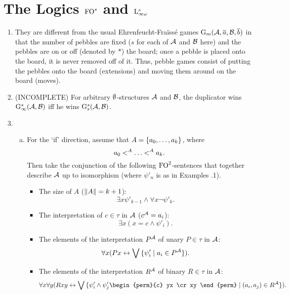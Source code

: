 \section{The Logics $\folog[s]$ and $\inflog[s]{\infty}$}
\begin{enumerate}[1.]
%
\item {} They are different from the usual Ehrenfeucht-Fra\"iss\'e games $\game{m}(\strct{A}, \vect{a}, \strct{B}, \vect{b})$ in that the number of pebbles are fixed ($s$ for each of $\mathcal{A}$ and $\mathcal{B}$ here) and the pebbles are on or off (denoted by $\ast$) the board; once a pebble is placed onto the board, it is never removed off of it. Thus, pebble games consist of putting the pebbles onto the board (extensions) and moving them around on the board (moves).
%
\item {} (INCOMPLETE) For arbitrary $\emptyset$-structures $\mathcal{A}$ and $\mathcal{B}$, the duplicator wins $\game[s]{\infty}(\strct{A}, \strct{B})$ iff he wins $\game[s]{s}(\strct{A}, \strct{B})$.
%
\item {}
\begin{enumerate}[(a)]
\item For the `if' direction, assume that $A = {\{a_0, \ldots, a_k\}}$, where
\[
a_0 \mathrel{<^{A}} \ldots \mathrel{<^{A}} a_k.
\]
Then take the conjunction of the following $\folog[2]$-sentences that together describe $\mathcal{A}$ up to isomorphism (where $\psi'_n$ is as in Examples \thesection.1).
\begin{itemize}
\item The size of $A$ ($\|A\| = k + 1$):
\[
\exists x \psi'_{k - 1} \land \forall x \neg\psi'_k.
\]
\item The interpretation of $c \in \tau$ in $\mathcal{A}$ ($c^{\mathcal{A}} = a_i$):
\[
\exists x (x = c \land \psi'_i).
\]
\item The elements of the interpretation $P^{\mathcal{A}}$ of unary $P \in \tau$ in $\mathcal{A}$:
\[
\forall x (Px \leftrightarrow \bigvee {\{\psi'_i \mid a_i \in P^{\mathcal{A}}\}}).
\]
\item The elements of the interpretation $R^{\mathcal{A}}$ of binary $R \in \tau$ in $\mathcal{A}$:
\[
\forall x \forall y (Rxy \liff \blor \setm{\psi'_i \land \psi'_j\begin{perm}{c} yx \cr xy \end{perm}}{(a_i, a_j) \in \intpr{R}{\strct{A}}}).
\]
\end{itemize}
\end{enumerate}
\end{enumerate}
